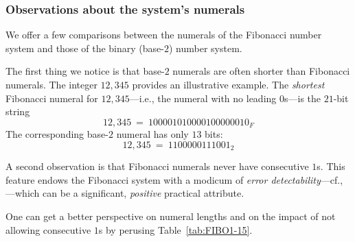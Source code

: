 \subsubsection{Observations about the system's numerals}

We offer a few comparisons between the numerals of the Fibonacci number system and those of the binary (base-$2$) number system.

\smallskip

The first thing we notice is that base-$2$ numerals are often shorter than Fibonacci numerals. The integer $12,345$ provides an illustrative example.  The {\em shortest} Fibonacci numeral for $12,345$---i.e., the numeral with no leading $0$s---is the $21$-bit string
\[ 12,345 \ = \ 1 00001 01000 01000 00010_F \]
The corresponding base-$2$ numeral has only $13$ bits:
\[ 12,345 \ = \ 110 00001 11001_2 \]

\medskip

A second observation is that Fibonacci numerals never have consecutive $1$s.  This feature endows the Fibonacci system with a modicum of {\em error detectability}---cf., \cite{PetersonW81}---which can be a significant, {\em positive} practical attribute.


\medskip

One can get a better perspective on numeral lengths and on the impact of not allowing consecutive $1$s by perusing Table~\ref{tab:FIBO1-15}.

